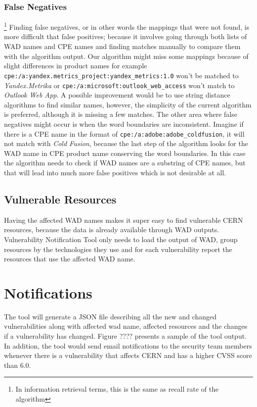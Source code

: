 \subsubsection{False Negatives}\footnote{In information retrieval terms, this is the same as recall rate of the algorithm}
Finding false negatives, or in other words the mappings that were not found, is more difficult that false positives; because it involves going through both lists of WAD names and CPE names and finding matches manually to compare them with the algorithm output. Our algorithm might miss some mappings because of slight differences in product names for example  \texttt{cpe:/a:yandex.metrics\_project:yandex\_metrics:1.0} won't be matched to \textit{Yandex.Metrika} or \texttt{cpe:/a:microsoft:outlook\_web\_access} won't match to \textit{Outlook Web App}. A possible improvement would be to use string distance algorithms to find similar names, however, the simplicity of the current algorithm is preferred, although it is missing a few matches. 
The other area where false negatives might occur is when the word boundaries are inconsistent. Imagine if there is a CPE name in the format of \texttt{cpe:/a:adobe:adobe\_coldfusion}, it will not match with \textit{Cold Fusion}, because the last step of the algorithm looks for the WAD name in CPE product name conserving the word boundaries. In this case the algorithm needs to check if WAD names are a substring of CPE names, but that will lead into much more false positives which is not desirable at all.  

\subsection{Vulnerable Resources}
Having the affected WAD names makes it super easy to find vulnerable CERN resources, because the data is already available through WAD outputs. Vulnerability Notification Tool only needs to load the output of WAD, group resources by the technologies they use and for each vulnerability report the resources that use the affected WAD name. 
\section{Notifications}
The tool will generate a JSON file describing all the new and changed vulnerabilities along with affected wad name, affected resources and the changes if a vulnerability has changed. Figure ???? presents a sample of the tool output. 
In addition, the tool would send email notifications to the security team members whenever there is a vulnerability that affects CERN and has a higher CVSS score than 6.0. 


